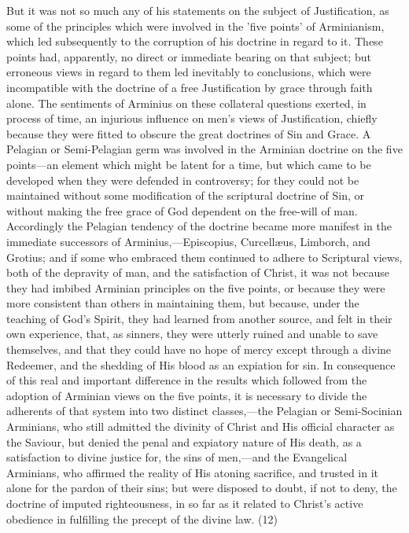 \documentclass[
]{book}
\begin{document}
But it was not so much any of his statements on the subject of Justification, as some of the principles which were involved in the 'five points' of Arminianism, which led subsequently to the corruption of his doctrine in regard to it. These points had, apparently, no direct or immediate bearing on that subject; but erroneous views in regard to them led inevitably to conclusions, which were incompatible with the doctrine of a free Justification by grace through faith alone. The sentiments of Arminius on these collateral questions exerted, in process of time, an injurious influence on men's views of Justification, chiefly because they were fitted to obscure the great doctrines of Sin and Grace. A Pelagian or Semi-Pelagian germ was involved in the Arminian doctrine on the five points---an element which might be latent for a time, but which came to be developed when they were defended in controversy; for they could not be maintained without some modification of the scriptural doctrine of Sin, or without making the free grace of God dependent on the free-will of man. Accordingly the Pelagian tendency of the doctrine became more manifest in the immediate successors of Arminius,---Episcopius, Curcellæus, Limborch, and Grotius; and if some who embraced them continued to adhere to Scriptural views, both of the depravity of man, and the satisfaction of Christ, it was not because they had imbibed Arminian principles on the five points, or because they were more consistent than others in maintaining them, but because, under the teaching of God's Spirit, they had learned from another source, and felt in their own experience, that, as sinners, they were utterly ruined and unable to save themselves, and that they could have no hope of mercy except through a divine Redeemer, and the shedding of His blood as an expiation for sin. In consequence of this real and important difference in the results which followed from the adoption of Arminian views on the five points, it is necessary to divide the adherents of that system into two distinct classes,---the Pelagian or Semi-Socinian Arminians, who still admitted the divinity of Christ and His official character as the Saviour, but denied the penal and expiatory nature of His death, as a satisfaction to divine justice for, the sins of men,---and the Evangelical Arminians, who affirmed the reality of His atoning sacrifice, and trusted in it alone for the pardon of their sins; but were disposed to doubt, if not to deny, the doctrine of imputed righteousness, in so far as it related to Christ's active obedience in fulfilling the precept of the divine law. (12)
\end{document}
